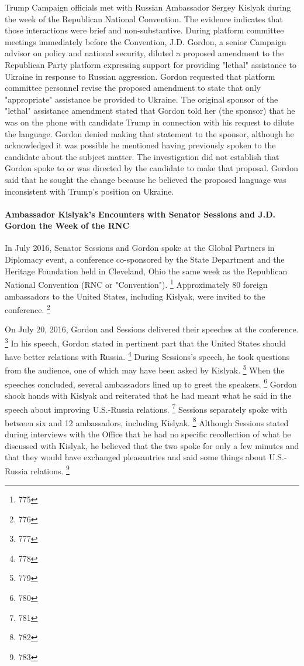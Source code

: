 Trump Campaign officials met with Russian Ambassador Sergey Kislyak during the week of the Republican National Convention.
The evidence indicates that those interactions were brief and non-substantive.
During platform committee meetings immediately before the Convention, J.D. Gordon, a senior Campaign advisor on policy and national security, diluted a proposed amendment to the Republican Party platform expressing support for providing "lethal" assistance to Ukraine in response to Russian aggression.
Gordon requested that platform committee personnel revise the proposed amendment to state that only "appropriate" assistance be provided to Ukraine.
The original sponsor of the "lethal" assistance amendment stated that Gordon told her (the sponsor) that he was on the phone with candidate Trump in connection with his request to dilute the language.
Gordon denied making that statement to the sponsor, although he acknowledged it was possible he mentioned having previously spoken to the candidate about the subject matter.
The investigation did not establish that Gordon spoke to or was directed by the candidate to make that proposal.
Gordon said that he sought the change because he believed the proposed language was inconsistent with Trump's position on Ukraine.

\paragraph{Ambassador Kislyak's Encounters with Senator Sessions and J.D. Gordon the Week of the RNC}

In July 2016, Senator Sessions and Gordon spoke at the Global Partners in Diplomacy event, a conference co-sponsored by the State Department and the Heritage Foundation held in Cleveland, Ohio the same week as the Republican National Convention (RNC or "Convention").%
\footnote{775}
Approximately 80 foreign ambassadors to the United States, including Kislyak, were invited to the conference.%
\footnote{776}

On July 20, 2016, Gordon and Sessions delivered their speeches at the conference.%
\footnote{777}
In his speech, Gordon stated in pertinent part that the United States should have better relations with Russia.%
\footnote{778}
During Sessions's speech, he took questions from the audience, one of which may have been asked by Kislyak.%
\footnote{779}
When the speeches concluded, several ambassadors lined up to greet the speakers.%
\footnote{780}
Gordon shook hands with Kislyak and reiterated that he had meant what he said in the speech about improving U.S.-Russia relations.%
\footnote{781}
Sessions separately spoke with between six and 12 ambassadors, including Kislyak.%
\footnote{782}
Although Sessions stated during interviews with the Office that he had no specific recollection of what he discussed with Kislyak, he believed that the two spoke for only a few minutes and that they would have exchanged pleasantries and said some things about U.S.-Russia relations.%
\footnote{783}

